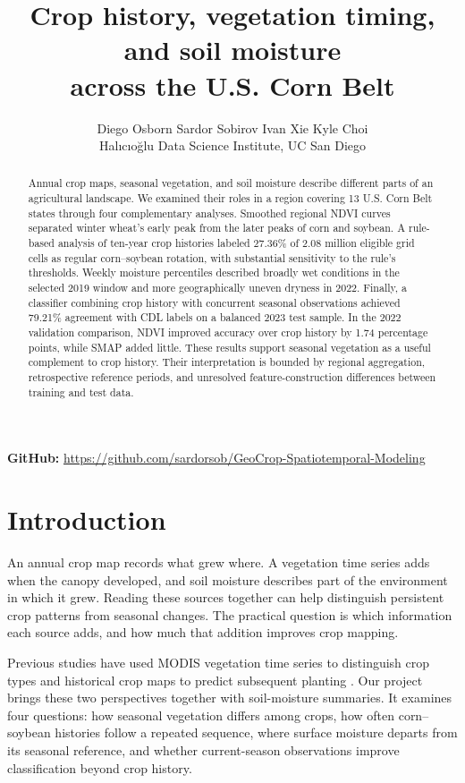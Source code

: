 \documentclass[11pt,letterpaper]{article}
\title{Crop history, vegetation timing, and soil moisture\\across the U.S. Corn Belt}
\author{Diego Osborn \quad Sardor Sobirov \quad Ivan Xie \quad Kyle Choi\\[3pt]
\small Hal{\i}c{\i}o{\u g}lu Data Science Institute, UC San Diego}
\date{}
\begin{document}
\maketitle
\vspace{-2em}

\begin{abstract}
Annual crop maps, seasonal vegetation, and soil moisture describe different parts of an agricultural landscape. We examined their roles in a region covering 13 U.S. Corn Belt states through four complementary analyses. Smoothed regional NDVI curves separated winter wheat's early peak from the later peaks of corn and soybean. A rule-based analysis of ten-year crop histories labeled 27.36\% of 2.08 million eligible grid cells as regular corn--soybean rotation, with substantial sensitivity to the rule's thresholds. Weekly moisture percentiles described broadly wet conditions in the selected 2019 window and more geographically uneven dryness in 2022. Finally, a classifier combining crop history with concurrent seasonal observations achieved 79.21\% agreement with CDL labels on a balanced 2023 test sample. In the 2022 validation comparison, NDVI improved accuracy over crop history by 1.74 percentage points, while SMAP added little. These results support seasonal vegetation as a useful complement to crop history. Their interpretation is bounded by regional aggregation, retrospective reference periods, and unresolved feature-construction differences between training and test data.
\end{abstract}

{\centering\small\textbf{GitHub: }\url{https://github.com/sardorsob/GeoCrop-Spatiotemporal-Modeling}\par}

\section{Introduction}
\label{sec:introduction}
An annual crop map records what grew where. A vegetation time series adds when the canopy developed, and soil moisture describes part of the environment in which it grew. Reading these sources together can help distinguish persistent crop patterns from seasonal changes. The practical question is which information each source adds, and how much that addition improves crop mapping.

Previous studies have used MODIS vegetation time series to distinguish crop types \citep{wardlow2007modis} and historical crop maps to predict subsequent planting \citep{zhang2019cropprediction}. Our project brings these two perspectives together with soil-moisture summaries. It examines four questions: how seasonal vegetation differs among crops, how often corn--soybean histories follow a repeated sequence, where surface moisture departs from its seasonal reference, and whether current-season observations improve classification beyond crop history.
\end{document}
